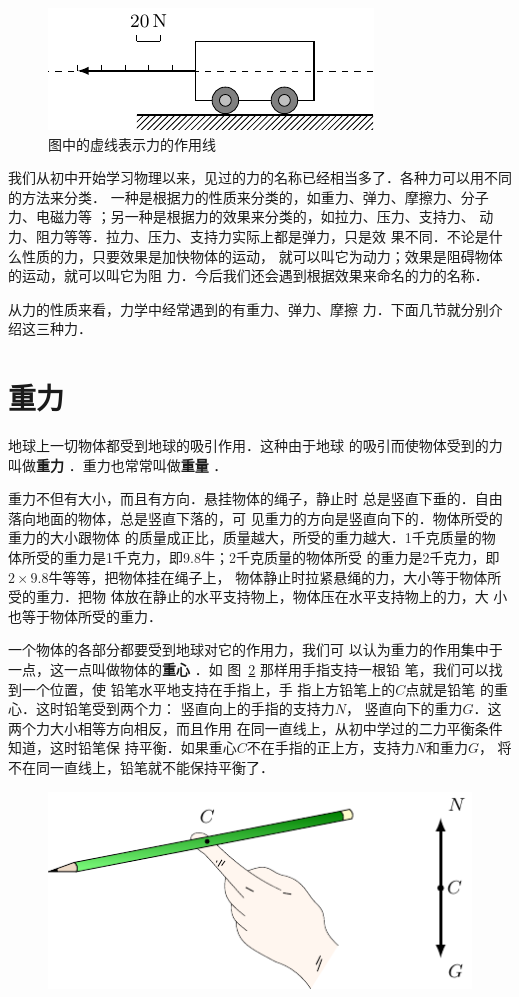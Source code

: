 \begin{figure} [htp]\centering
\includegraphics{fig/A/1-1.pdf} 
\caption{图中的虚线表示力的作用线} \label{fig_A_1-1} 
\end{figure} 

我们从初中开始学习物理以来，见过的力的名称已经相当多了．各种力可以用不同的方法来分类．
一种是根据力的性质来分类的，如重力、弹力、摩擦力、分子力、电磁力等
；另一种是根据力的效果来分类的，如拉力、压力、支持力、
动力、阻力等等．拉力、压力、支持力实际上都是弹力，只是效
果不同．不论是什么性质的力，只要效果是加快物体的运动，
就可以叫它为动力；效果是阻碍物体的运动，就可以叫它为阻
力．今后我们还会遇到根据效果来命名的力的名称．

    从力的性质来看，力学中经常遇到的有重力、弹力、摩擦
力．下面几节就分别介绍这三种力．


\section{重力} 
    地球上一切物体都受到地球的吸引作用．这种由于地球
的吸引而使物体受到的力叫做\textbf{重力} ．重力也常常叫做\textbf{重量} ．

    重力不但有大小，而且有方向．悬挂物体的绳子，静止时
总是竖直下垂的．自由落向地面的物体，总是竖直下落的，可
见重力的方向是竖直向下的．物体所受的重力的大小跟物体
的质量成正比，质量越大，所受的重力越大．1千克质量的物
体所受的重力是1千克力，即9.8牛；2千克质量的物体所受
的重力是2千克力，即$2\times 9.8$牛等等，把物体挂在绳子上，
物体静止时拉紧悬绳的力，大小等于物体所受的重力．把物
体放在静止的水平支持物上，物体压在水平支持物上的力，大
小也等于物体所受的重力．

    一个物体的各部分都要受到地球对它的作用力，我们可
以认为重力的作用集中于一点，这一点叫做物体的\textbf{重心} ．如
图~\ref{fig_A_1-2} 那样用手指支持一根铅
笔，我们可以找到一个位置，使
铅笔水平地支持在手指上，手
指上方铅笔上的$C$点就是铅笔
的重心．这时铅笔受到两个力：
竖直向上的手指的支持力$N$，
竖直向下的重力$G$．这两个力大小相等方向相反，而且作用
在同一直线上，从初中学过的二力平衡条件知道，这时铅笔保
持平衡．如果重心$C$不在手指的正上方，支持力$N$和重力$G$，
将不在同一直线上，铅笔就不能保持平衡了．
\begin{figure} [htp]
\centering
\includegraphics{fig/A/1-2.pdf} 
\caption{} \label{fig_A_1-2} 
\end{figure} 

